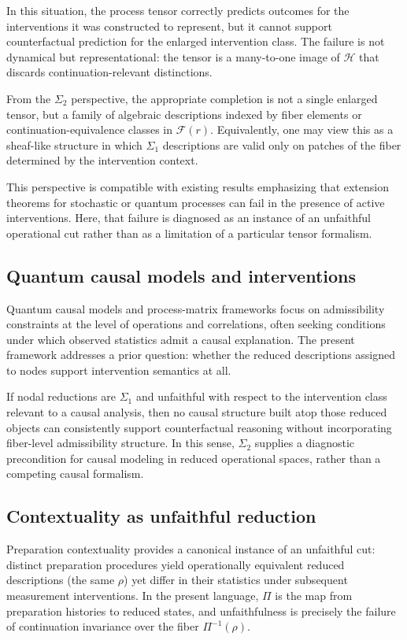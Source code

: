In this situation, the process tensor correctly predicts outcomes for the interventions it was
constructed to represent, but it cannot support counterfactual prediction for the enlarged
intervention class. The failure is not dynamical but representational: the tensor is a many-to-one
image of $\mathcal{H}$ that discards continuation-relevant distinctions.

From the $\Sigma_2$ perspective, the appropriate completion is not a single enlarged tensor, but a
family of algebraic descriptions indexed by fiber elements or continuation-equivalence classes in
$\mathcal{F}(r)$. Equivalently, one may view this as a sheaf-like structure in which $\Sigma_1$
descriptions are valid only on patches of the fiber determined by the intervention context.

This perspective is compatible with existing results emphasizing that extension theorems for
stochastic or quantum processes can fail in the presence of active interventions. Here, that
failure is diagnosed as an instance of an unfaithful operational cut rather than as a limitation
of a particular tensor formalism.

\subsection{Quantum causal models and interventions}

Quantum causal models and process-matrix frameworks focus on admissibility constraints at the level
of operations and correlations, often seeking conditions under which observed statistics admit a
causal explanation. The present framework addresses a prior question: whether the reduced
descriptions assigned to nodes support intervention semantics at all.

If nodal reductions are $\Sigma_1$ and unfaithful with respect to the intervention class relevant to
a causal analysis, then no causal structure built atop those reduced objects can consistently
support counterfactual reasoning without incorporating fiber-level admissibility structure. In
this sense, $\Sigma_2$ supplies a diagnostic precondition for causal modeling in reduced operational
spaces, rather than a competing causal formalism.

\subsection{Contextuality as unfaithful reduction}

Preparation contextuality provides a canonical instance of an unfaithful cut: distinct preparation
procedures yield operationally equivalent reduced descriptions (the same $\rho$) yet differ in
their statistics under subsequent measurement interventions. In the present language, $\Pi$ is the
map from preparation histories to reduced states, and unfaithfulness is precisely the failure of
continuation invariance over the fiber $\Pi^{-1}(\rho)$.


